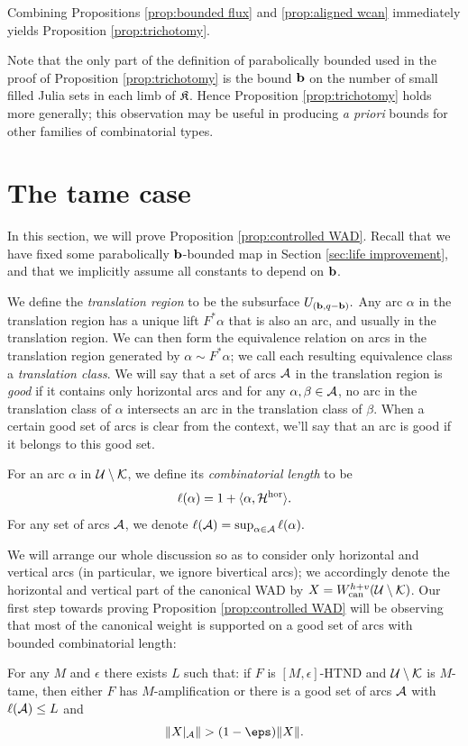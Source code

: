 \documentclass[12pt]{amsart}
\begin{document}
Combining Propositions \ref{prop:bounded flux} and \ref{prop:aligned wcan} immediately yields Proposition \ref{prop:trichotomy}.

\begin{rem}
    Note that the only part of the definition of parabolically bounded used in the proof of Proposition \ref{prop:trichotomy} is the bound $\bound$ on the number of small filled Julia sets in each limb of $\FK$. Hence Proposition \ref{prop:trichotomy} holds more generally; this observation may be useful in producing \emph{a priori} bounds for other families of combinatorial types.
\end{rem}

\section{The tame case}\label{sec:aligned}

In this section, we will prove Proposition \ref{prop:controlled WAD}. 
Recall that we have fixed some parabolically $\bound$-bounded \pql map in Section \ref{sec:life improvement}, and that we implicitly assume all constants to depend on $\bound$.



We define the \textit{translation region} 
to be the subsurface $U_{(\bound, q-\bound)}.$
Any arc $\alpha$ in the translation region has a unique lift $F^*\alpha$ that is also an arc, and usually in the translation region. 
We can then form the equivalence relation on arcs in the translation region generated by $\alpha\sim F^*\alpha$; we call each resulting equivalence class a \emph{translation class}. 
We will say that a set of arcs $\AA$ in the translation region is \textit{good}  if it contains only horizontal arcs and for any $\alpha, \beta\in \AA$, no arc in the translation class of $\alpha$ intersects an arc in the translation class of $\beta$. 
When a certain good set of arcs is clear from the context, 
we'll say that an arc is good if it belongs to this good set.

For an arc $\alpha$ in $\UU\sm \KK$,  
we define its \textit{combinatorial length} to be 
$$\ell(\alpha) = 1+\langle \alpha, \HH^\hor\rangle.$$
For any set of arcs $\AA$, we denote $\ell(\AA) = \sup_{\alpha\in \AA}\ell(\alpha).$

We will arrange our whole discussion so as to consider only horizontal and vertical arcs (in particular, we ignore bivertical arcs);
we accordingly denote the horizontal and vertical part of the canonical WAD by $X = \wcan^{h+v}(\UU\sm \KK)$. 
Our first step towards proving Proposition \ref{prop:controlled WAD} will be observing that most of the canonical weight is supported on a good set of arcs with bounded combinatorial length:
\begin{lem} \label{lem:bounded-combinatorial}	
	For any $M$ and $\epsilon$ there exists $L$ such that: 
	if $F$ is $[M, \epsilon]$-HTND and $\UU\sm \KK$ is $M$-tame, then either $F$ has $M$-amplification or there is a good set of arcs $\AA$  with $\ell(\AA)\leq L$ and $$\|X|_\AA\|> (1-\eps)\|\xhv\|.$$
\end{lem}
\end{document}
